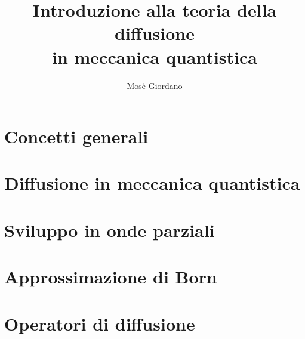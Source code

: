 \documentclass[a4paper,fleqn,twoside]{article}
\title{Introduzione alla teoria della diffusione \\ in meccanica quantistica}
\author{Mosè Giordano}
\begin{document}
\maketitle

\section{Concetti generali}
\label{sec:concetti-generali}

\section{Diffusione in meccanica quantistica}
\label{sec:meccanica-quantistica}

\section{Sviluppo in onde parziali}
\label{sec:onde-parziali}

\section{Approssimazione di Born}
\label{sec:approx-born}

\section{Operatori di diffusione}
\label{sec:operatori-diffusione}

{}
\nocite{*}
\printbibliography
\end{document}
